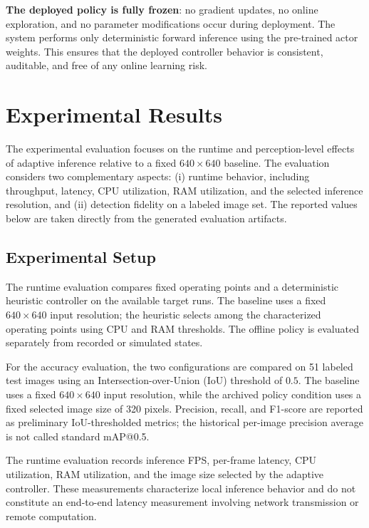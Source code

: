 \documentclass{ieeeaccess}
\begin{document}
\textbf{The deployed policy is fully frozen}: no gradient updates, no
online exploration, and no parameter modifications occur during deployment.
The system performs only deterministic forward inference using the
pre-trained actor weights. This ensures that the deployed controller
behavior is consistent, auditable, and free of any online learning risk.

\section{Experimental Results}
\label{sec:experiments}

The experimental evaluation focuses on the runtime and perception-level
effects of adaptive inference relative to a fixed $640\times640$ baseline.
The evaluation considers two complementary aspects: (i) runtime behavior,
including throughput, latency, CPU utilization, RAM utilization, and the
selected inference resolution, and (ii) detection fidelity on a labeled
image set. The reported values below are taken directly from the generated
evaluation artifacts.

\subsection{Experimental Setup}
\label{subsec:exp_setup}

The runtime evaluation compares fixed operating points and a deterministic
heuristic controller on the available target runs. The baseline uses a fixed
$640\times640$ input resolution; the heuristic selects among the
characterized operating points using CPU and RAM thresholds. The offline
policy is evaluated separately from recorded or simulated states.

For the accuracy evaluation, the two configurations are compared on 51
labeled test images using an Intersection-over-Union (IoU) threshold of
$0.5$. The baseline uses a fixed $640\times640$ input resolution, while the
archived policy condition uses a fixed selected image size of 320 pixels.
Precision, recall, and F1-score are reported as preliminary IoU-thresholded
metrics; the historical per-image precision average is not called standard
mAP@0.5.

The runtime evaluation records inference FPS, per-frame latency, CPU
utilization, RAM utilization, and the image size selected by the adaptive
controller. These measurements characterize local inference behavior and do
not constitute an end-to-end latency measurement involving network
transmission or remote computation.
\end{document}
